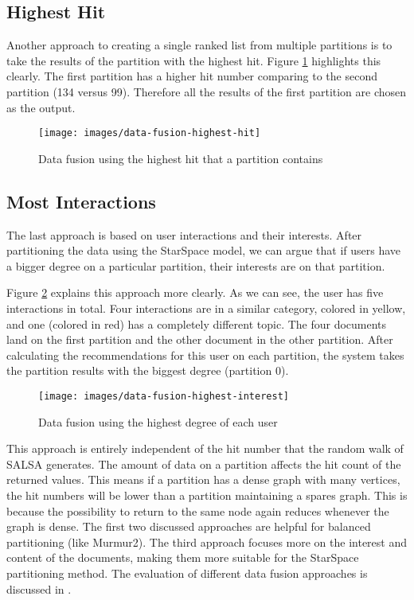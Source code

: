 \subsection{Highest Hit}
\label{subsec:data-fusion-highest-hit}
Another approach to creating a single ranked list from multiple partitions is to take the results of the partition with the highest hit. Figure \ref{fig:data-fusion-highest-hit} highlights this clearly. The first partition has a higher hit number comparing to the second partition (134 versus 99). Therefore all the results of the first partition are chosen as the output.
\begin{figure}[!h]
	\centering
	\texttt{[image: images/data-fusion-highest-hit]}
	\caption{Data fusion using the highest hit that a partition contains}
	\label{fig:data-fusion-highest-hit}
\end{figure}

\subsection{Most Interactions}
\label{subsec:data-fusion-most-interactions}
The last approach is based on user interactions and their interests. After partitioning the data using the StarSpace model, we can argue that if users have a bigger degree on a particular partition, their interests are on that partition.


Figure \ref{fig:data-fusion-highest-ineterest} explains this approach more clearly. As we can see, the user has five interactions in total. Four interactions are in a similar category, colored in yellow, and one (colored in red) has a completely different topic. The four documents land on the first partition and the other document in the other partition. After calculating the recommendations for this user on each partition, the system takes the partition results with the biggest degree (partition 0).


\begin{figure}[!h]
	\centering
	\texttt{[image: images/data-fusion-highest-interest]}
	\caption{Data fusion using the highest degree of each user}
	\label{fig:data-fusion-highest-ineterest}
\end{figure}


This approach is entirely independent of the hit number that the random walk of SALSA generates. The amount of data on a partition affects the hit count of the returned values. This means if a partition has a dense graph with many vertices, the hit numbers will be lower than a partition maintaining a spares graph. This is because the possibility to return to the same node again reduces whenever the graph is dense. The first two discussed approaches are helpful for balanced partitioning (like Murmur2). The third approach focuses more on the interest and content of the documents, making them more suitable for the StarSpace partitioning method. The evaluation of different data fusion approaches is discussed in .

